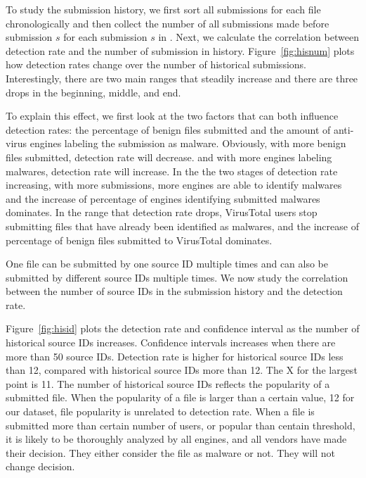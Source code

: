 To study the submission history, we first sort all submissions for each file chronologically
and then collect the number of all submissions made before submission $s$ for each submission $s$ in \vt.
Next, we calculate the correlation between detection rate and the number of submission in history.
Figure~\ref{fig:hisnum} plots how detection rates change over the number of historical submissions.
Interestingly, there are two main ranges that steadily increase and there are three drops in the beginning, middle, and end.

To explain this effect, we first look at the two factors that can both influence detection rates:
the percentage of benign files submitted and the amount of anti-virus engines labeling the submission as malware.
Obviously, with more benign files submitted, detection rate will decrease.   
and with more engines labeling malwares, detection rate will increase. 
In the the two stages of detection rate increasing, 
with more submissions, more engines are able to identify malwares 
and the increase of percentage of engines identifying submitted malwares dominates. 
In the range that detection rate drops, 
VirusTotal users stop submitting files that have already been identified as malwares,
and the increase of percentage of benign files submitted to VirusTotal dominates. 

One file can be submitted by one source ID multiple times 
and can also be submitted by different source IDs multiple times. 
We now study the correlation between the number of source IDs in the submission history and the detection rate. 

Figure~\ref{fig:hisid} plots the detection rate and confidence interval as the number of historical source IDs increases. 
Confidence intervals increases when there are more than 50 source IDs. 
Detection rate is higher for historical source IDs less than 12, compared with historical source IDs more than 12.
{\color{red} The X for the largest point is 11. }
The number of historical source IDs reflects the popularity of a submitted file.
When the popularity of a file is larger than a certain value, 12 for our dataset, 
file popularity is unrelated to detection rate. 
{\color{red} When a file is submitted more than certain number of users, or popular than centain threshold, 
it is likely to be thoroughly analyzed by all engines, and all vendors have made their decision. 
They either consider the file as malware or not. They will not change decision. }

